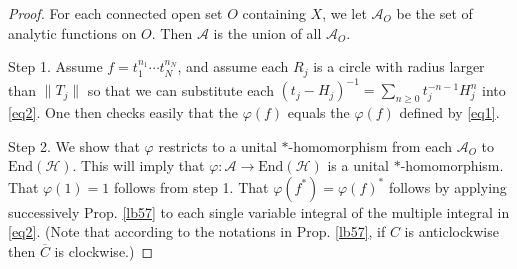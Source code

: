 \documentclass[12pt,b5paper,notitlepage]{article}
\theoremstyle{definition}
\theoremstyle{plain}
\newcommand{\mc}{\mathcal}
\newcommand{\ovl}{\overline}
\newcommand{\End}{\mathrm{End}} %
\numberwithin{equation}{section}
\begin{document}
\begin{proof}
For each connected open set $O$ containing $X$, we let $\mc A_O$ be the set  of  analytic functions on $O$. Then $\mc A$ is the union of all $\mc A_O$.

Step 1. Assume $ f=t_1^{n_1}\cdots t_N^{n_N}$, and assume each $R_j$ is a circle with radius larger than $\lVert T_j\lVert$ so that we can substitute each $(t_j-H_j)^{-1}=\sum_{n\geq 0}t_j^{-n-1}H_j^n$ into \eqref{eq2}. One then checks easily that the $\varphi( f)$ equals the $\varphi(f)$ defined by \eqref{eq1}. 

Step 2. We show that $\varphi$ restricts to a unital $*$-homomorphism from each $\mc A_O$ to $\End(\mc H)$. This will imply that $\varphi:\mc A\rightarrow\End(\mc H)$ is a unital $*$-homomorphism. That $\varphi(1)=1$ follows from step 1. That $\varphi(f^*)=\varphi(f)^*$ follows by applying successively Prop. \ref{lb57} to each single variable integral of the multiple integral in \eqref{eq2}. (Note that according to the notations in Prop. \ref{lb57}, if $C$ is anticlockwise then $\ovl C$ is clockwise.)


\end{proof}
\end{document}

